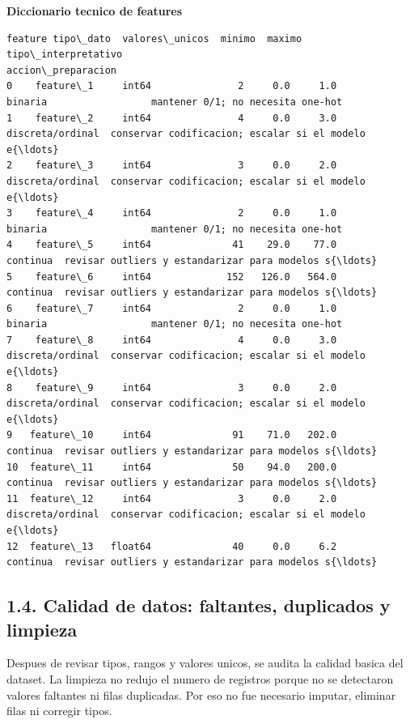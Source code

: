 \documentclass[11pt]{article}
\begin{document}
    \textbf{Diccionario tecnico de features}

    
    
    \begin{Verbatim}[commandchars=\\\{\}]
       feature tipo\_dato  valores\_unicos  minimo  maximo tipo\_interpretativo                                 accion\_preparacion
0    feature\_1     int64               2     0.0     1.0             binaria                  mantener 0/1; no necesita one-hot
1    feature\_2     int64               4     0.0     3.0    discreta/ordinal  conservar codificacion; escalar si el modelo e{\ldots}
2    feature\_3     int64               3     0.0     2.0    discreta/ordinal  conservar codificacion; escalar si el modelo e{\ldots}
3    feature\_4     int64               2     0.0     1.0             binaria                  mantener 0/1; no necesita one-hot
4    feature\_5     int64              41    29.0    77.0            continua  revisar outliers y estandarizar para modelos s{\ldots}
5    feature\_6     int64             152   126.0   564.0            continua  revisar outliers y estandarizar para modelos s{\ldots}
6    feature\_7     int64               2     0.0     1.0             binaria                  mantener 0/1; no necesita one-hot
7    feature\_8     int64               4     0.0     3.0    discreta/ordinal  conservar codificacion; escalar si el modelo e{\ldots}
8    feature\_9     int64               3     0.0     2.0    discreta/ordinal  conservar codificacion; escalar si el modelo e{\ldots}
9   feature\_10     int64              91    71.0   202.0            continua  revisar outliers y estandarizar para modelos s{\ldots}
10  feature\_11     int64              50    94.0   200.0            continua  revisar outliers y estandarizar para modelos s{\ldots}
11  feature\_12     int64               3     0.0     2.0    discreta/ordinal  conservar codificacion; escalar si el modelo e{\ldots}
12  feature\_13   float64              40     0.0     6.2            continua  revisar outliers y estandarizar para modelos s{\ldots}
    \end{Verbatim}

    
    \subsection{1.4. Calidad de datos: faltantes, duplicados y
limpieza}\label{calidad-de-datos-faltantes-duplicados-y-limpieza}

Despues de revisar tipos, rangos y valores unicos, se audita la calidad
basica del dataset. La limpieza no redujo el numero de registros porque
no se detectaron valores faltantes ni filas duplicadas. Por eso no fue
necesario imputar, eliminar filas ni corregir tipos.
\end{document}
